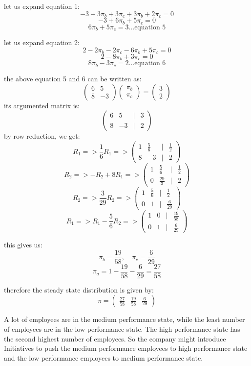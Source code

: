 \documentclass{article}
\begin{document}
let us expand equation 1:
\[-3 + 3\pi_b + 3\pi_c + 3\pi_b + 2\pi_c = 0\]
\[-3 + 6\pi_b + 5\pi_c = 0\]
\[6\pi_b + 5\pi_c = 3 \ldots\text{equation 5}\]

let us expand equation 2:
\[2 - 2\pi_b - 2\pi_c - 6\pi_b + 5\pi_c = 0\]
\[2 - 8\pi_b + 3\pi_c = 0\]
\[8\pi_b - 3\pi_c = 2 \ldots\text{equation 6}\]

the above equation 5 and 6 can be written as:
\[\begin{pmatrix}6&5\\8&-3\end{pmatrix}\begin{pmatrix}\pi_b\\\pi_c\end{pmatrix} = \begin{pmatrix}3\\2\end{pmatrix}\]
its argumented matrix is:
\[\begin{pmatrix}6&5&|&3\\8&-3&|&2\end{pmatrix}\]
by row reduction, we get:
\[R_1 => \frac{1}{6}R_1 => \begin{pmatrix}1&\frac{5}{6}&|&\frac{1}{2}\\8&-3&|&2\end{pmatrix}\]
\[R_2 => -R_2 + 8R_1 => \begin{pmatrix}1&\frac{5}{6}&|&\frac{1}{2}\\0&\frac{29}{3}&|&2\end{pmatrix}\]
\[R_2 => \frac{3}{29}R_2 => \begin{pmatrix}1&\frac{5}{6}&|&\frac{1}{2}\\0&1&|&\frac{6}{29}\end{pmatrix}\]
\[R_1 => R_1 - \frac{5}{6}R_2 => \begin{pmatrix}1&0&|&\frac{19}{58}\\0&1&|&\frac{6}{29}\end{pmatrix}\]

this gives us:
\[\pi_b = \frac{19}{58}, \quad \pi_c = \frac{6}{29}\]
\[\pi_a = 1 - \frac{19}{58} - \frac{6}{29} = \frac{27}{58}\]

therefore the steady state distribution is given by:
\[\pi = \begin{pmatrix}\frac{27}{58}&\frac{19}{58}&\frac{6}{29}\end{pmatrix}\]


A lot of employees are in the medium performance state, while the least number of employees are in the low performance state. The high performance state has the second highest number of employees. So the company might introduce Initiatives to push the medium performance employees to high performance state and the low performance employees to medium performance state.
\end{document}
